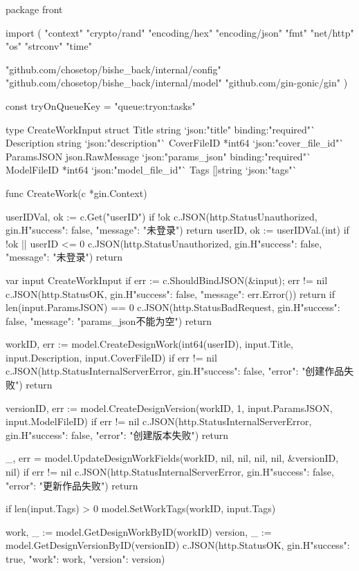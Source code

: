 \documentclass[twoside]{thesis-cls-Miya} %
\begin{document}
\iffalse
package front

import (
	"context"
	"crypto/rand"
	"encoding/hex"
	"encoding/json"
	"fmt"
	"net/http"
	"os"
	"strconv"
	"time"

	"github.com/chosetop/bishe_back/internal/config"
	"github.com/chosetop/bishe_back/internal/model"
	"github.com/gin-gonic/gin"
)

const tryOnQueueKey = "queue:tryon:tasks"

type CreateWorkInput struct {
	Title       string          `json:"title" binding:"required"`
	Description string          `json:"description"`
	CoverFileID *int64          `json:"cover_file_id"`
	ParamsJSON  json.RawMessage `json:"params_json" binding:"required"`
	ModelFileID *int64          `json:"model_file_id"`
	Tags        []string        `json:"tags"`
}

func CreateWork(c *gin.Context) {
	userIDVal, ok := c.Get("userID")
	if !ok {
		c.JSON(http.StatusUnauthorized, gin.H{"success": false, "message": "未登录"})
		return
	}
	userID, ok := userIDVal.(int)
	if !ok || userID <= 0 {
		c.JSON(http.StatusUnauthorized, gin.H{"success": false, "message": "未登录"})
		return
	}

	var input CreateWorkInput
	if err := c.ShouldBindJSON(&input); err != nil {
		c.JSON(http.StatusOK, gin.H{"success": false, "message": err.Error()})
		return
	}
	if len(input.ParamsJSON) == 0 {
		c.JSON(http.StatusBadRequest, gin.H{"success": false, "message": "params_json不能为空"})
		return
	}

	workID, err := model.CreateDesignWork(int64(userID), input.Title, input.Description, input.CoverFileID)
	if err != nil {
		c.JSON(http.StatusInternalServerError, gin.H{"success": false, "error": "创建作品失败"})
		return
	}

	versionID, err := model.CreateDesignVersion(workID, 1, input.ParamsJSON, input.ModelFileID)
	if err != nil {
		c.JSON(http.StatusInternalServerError, gin.H{"success": false, "error": "创建版本失败"})
		return
	}

	_, err = model.UpdateDesignWorkFields(workID, nil, nil, nil, nil, &versionID, nil)
	if err != nil {
		c.JSON(http.StatusInternalServerError, gin.H{"success": false, "error": "更新作品失败"})
		return
	}

	if len(input.Tags) > 0 {
		model.SetWorkTags(workID, input.Tags)
	}

	work, _ := model.GetDesignWorkByID(workID)
	version, _ := model.GetDesignVersionByID(versionID)
	c.JSON(http.StatusOK, gin.H{"success": true, "work": work, "version": version})
}
\end{document}
